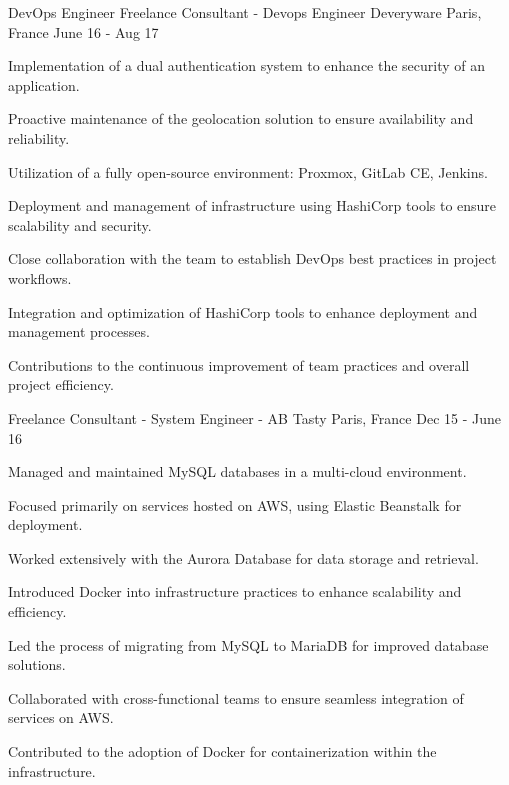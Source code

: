 \begin{cventries}
\cventry
{DevOps Engineer} %
{Freelance Consultant - Devops Engineer}
{Deveryware} %
{Paris, France} %
{June 16 - Aug 17} %
{
  \begin{cvitems} %
    \item {Implementation of a dual authentication system to enhance the security of an application.}
    \item {Proactive maintenance of the geolocation solution to ensure availability and reliability.}
    \item {Utilization of a fully open-source environment: Proxmox, GitLab CE, Jenkins.}
    \item {Deployment and management of infrastructure using HashiCorp tools to ensure scalability and security.}
    \item {Close collaboration with the team to establish DevOps best practices in project workflows.}
    \item {Integration and optimization of HashiCorp tools to enhance deployment and management processes.}
    \item {Contributions to the continuous improvement of team practices and overall project efficiency.}
  \end{cvitems}
}


\cventry
{Freelance Consultant - System Engineer - } %
{AB Tasty} %
{Paris, France} %
{Dec 15 - June 16} %
{
  \begin{cvitems} %
    \item {Managed and maintained MySQL databases in a multi-cloud environment.}
    \item {Focused primarily on services hosted on AWS, using Elastic Beanstalk for deployment.}
    \item {Worked extensively with the Aurora Database for data storage and retrieval.}
    \item {Introduced Docker into infrastructure practices to enhance scalability and efficiency.}
    \item {Led the process of migrating from MySQL to MariaDB for improved database solutions.}
    \item {Collaborated with cross-functional teams to ensure seamless integration of services on AWS.}
    \item {Contributed to the adoption of Docker for containerization within the infrastructure.}
  \end{cvitems}
}

\end{cventries}
